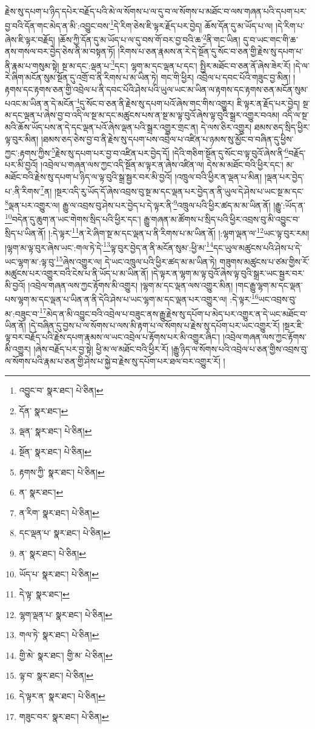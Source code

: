 རྗེས་སུ་དཔག་པ་ཉིད་དཔེར་བརྗོད་པའི་མེ་ལ་སོགས་པ་ལ་དུ་བ་ལ་སོགས་པ་མཐོང་བ་ལས་གཞན་པའི་དཔག་པར་བྱ་བའི་དོན་གང་མེད་ན་མི་:འབྱུང་བས་\footnote{འབྱུང་བ་  སྣར་ཐང་།  པེ་ཅིན། }དེ་རིག་ཅེས་ཇི་ལྟར་རྗོད་པར་བྱེད། ཆོས་དོན་དུ་མ་ཡོད་པ་ལ། །དེ་རིག་པ་ཞེས་ཇི་ལྟར་བརྗོད། །ཆོས་ཀྱི་དོན་དུ་མ་ཡོད་པ་ལ་དུ་བས་གོ་བར་བྱ་བའི་ཆ་\footnote{དོན་  སྣར་ཐང་། }ནི་གང་ཡིན། དུ་བ་ཡང་གང་གི་ཆ་ནས་གསལ་བར་བྱེད་ཅེས་ནི་མ་བསྟན་ཏོ། །རིགས་པ་ཅན་རྣམས་ན་རེ་དེ་སྔོན་དུ་སོང་བ་ཅན་གྱི་རྗེས་སུ་དཔག་པ་ནི་རྣམ་པ་གསུམ་སྟེ། སྔ་མ་དང་:ལྡན་པ་\footnote{ལྡན་  སྣར་ཐང་།  པེ་ཅིན། }དང་། ལྷག་མ་དང་ལྡན་པ་དང་། སྤྱིར་མཐོང་བ་ཅན་ནོ་ཞེས་ཟེར་རོ། །དེ་ལ་རེ་ཞིག་མངོན་སུམ་སྔོན་དུ་འགྲོ་བ་ནི་རིགས་པ་མ་ཡིན་ཏེ། གང་གི་ཕྱིར། འབྲེལ་པ་དབང་པོའི་གཟུང་བྱ་མིན། །རྟགས་དང་རྟགས་ཅན་གྱི་འབྲེལ་པ་ནི་དབང་པོའི་ཤེས་པའི་ཡུལ་ཡང་མ་ཡིན་ལ་རྟགས་དང་རྟགས་ཅན་མངོན་སུམ་པའང་མ་ཡིན་ན་དེ་མངོན་\footnote{སྔོན་  སྣར་ཐང་།  པེ་ཅིན། }དུ་སོང་བ་ཅན་ནི་རྗེས་སུ་དཔག་པའོ་ཞེས་གང་གིས་འགྱུར། ཇི་ལྟར་ན་རྗོད་པར་བྱེད། སྔ་མ་དང་ལྡན་པ་ཞེས་བྱ་བ་འདི་ལ་སྔ་མ་དང་མཚུངས་པས་ན་སྔ་མ་ལྟ་བུའོ་ཞེས་ལྟ་བུའི་སྒྲར་འགྱུར་བའམ། འདི་ལ་སྔ་མའི་ཆོས་ཡོད་པས་ན་དེ་དང་ལྡན་པའོ་ཞེས་ལྡན་པའི་སྒྲར་འགྱུར་གྲང་ན། དེ་ལས་ཅིར་འགྱུར། ཐམས་ཅད་སྲིད་ཕྱིར་ལྟ་བུར་མིན། །ཐམས་ཅད་ཅེས་བྱ་བ་ནི་རྗེས་སུ་དཔག་པས་འབྲེལ་པ་འཛིན་པ་ཉམས་སུ་མྱོང་བ་བཞིན་དུ་ཕྱིས་ཀྱང་:རྟགས་ཀྱིས་\footnote{རྟགས་ཀྱི་  སྣར་ཐང་།  པེ་ཅིན། }རྗེས་སུ་དཔག་པར་བྱ་བ་འཛིན་པར་བྱེད་དོ། །དེའི་གཅིག་སྔོན་དུ་སོང་བ་ལྟ་བུའོ་ཞེས་ནི་\footnote{ན་  སྣར་ཐང་། }བརྗོད་པར་མི་བྱའོ། །འབྲེལ་པ་གཞན་ལས་ཀྱང་འདི་སྔོན་མ་ལྟར་ན་ཞེས་འཛིན་ལ། དེས་མ་མཐོང་བའི་ཕྱིར་དང་། མ་མཐོང་བའི་རྗེས་སུ་དཔག་པ་ཉིད་ལ་ལྟ་བུའི་སྒྲ་སྦྱར་བར་མི་བྱའོ། །འཁྲུལ་བའི་ཕྱིར་ན་ལྡན་པ་མིན། །ལྡན་པར་བྱེད་པ་:ནི་རིགས་\footnote{ན་རིག་  སྣར་ཐང་།  པེ་ཅིན། }ན། །སྔར་འདི་རུ་ཡོད་དོ་ཞེས་འབྲས་བུ་སྔ་མ་དང་ལྡན་པར་བྱེད་ན་ནི་ཡུལ་དེ་ཤེས་པ་ཡང་སྔ་མ་དང་\footnote{དང་ལྡན་པ་  སྣར་ཐང་།  པེ་ཅིན། }ལྡན་པར་འགྱུར་ལ། རྒྱུ་ལ་འབྲས་བུ་ཤེས་པར་བྱེད་པ་དེ་ལྟར་ནི་\footnote{ན་  སྣར་ཐང་།  པེ་ཅིན། }འཁྲུལ་པའི་ཕྱིར་ཚད་མ་མ་ཡིན་ནོ། །རྒྱུ་:ཡོད་ན་\footnote{ཡོད་པ་  སྣར་ཐང་།  པེ་ཅིན། }བདེན་དུ་ཆུག་ན་ཡང་གེགས་སྲིད་པའི་ཕྱིར་དང་། རྒྱུ་གཞན་མ་ཚོགས་པ་སྲིད་པའི་ཕྱིར་འབྲས་བུ་མི་འབྱུང་བ་སྲིད་པ་ཡིན་ནོ། །:དེ་ལྟར་\footnote{དེ་ལྟ་  སྣར་ཐང་། }ན་རེ་ཞིག་སྔ་མ་དང་ལྡན་པ་ནི་རིགས་པ་མ་ཡིན་ནོ། །:ལྷག་ལྡན་ལ་\footnote{ལྷག་ལྡན་པ་  སྣར་ཐང་།  པེ་ཅིན། }ཡང་ལྟ་བུར་རམ། །ལྷག་མ་ལྟ་བུར་ཞེས་ཡང་:གལ་ཏེ་དེ་\footnote{གལ་ཏེ་  སྣར་ཐང་།  པེ་ཅིན། }ལྟ་བུར་བྱེད་ན་ནི་མངོན་སུམ་:ཕྱི་མ་\footnote{གྱི་མེ་  སྣར་ཐང་། གྱི་མ་  པེ་ཅིན། }དང་ཡུལ་མཚུངས་པའི་ཤེས་པ་དེ་ཡང་ལྷག་མ་:ལྟ་བུ་\footnote{ལྟ་བ་  སྣར་ཐང་།  པེ་ཅིན། }ཞེས་འགྱུར་ལ། དེ་ཡང་འཁྲུལ་པའི་ཕྱིར་ཚད་མ་མ་ཡིན་ཏེ། གཟུགས་མཚུངས་པ་ཙམ་གྱིས་རོ་མཚུངས་པར་འགྱུར་བའི་ངེས་པ་ནི་ཡོད་པ་མ་ཡིན་ནོ། །དེ་ལྟར་ན་ལྷག་མ་ལྟ་བུའོ་ཞེས་ལྟ་བུའི་སྒྲར་ཡང་སྦྱར་བར་མི་བྱའོ། །འབྲེལ་གཞན་ལས་ཀྱང་རྟོགས་མི་འགྱུར། །ལྷག་མ་དང་ལྡན་ལས་འགྱུར་མིན། །གང་རྒྱུ་ལྷག་མ་དང་ལྡན་པས་ལྷག་མ་དང་ལྡན་པ་ཡིན་ན་ནི་དེའི་ཤེས་པ་ཡང་ལྷག་མ་དང་ལྡན་པར་འགྱུར་ལ། :དེ་ལྟར་\footnote{དེ་ལྟར་ན་  སྣར་ཐང་།  པེ་ཅིན། }ཡང་འབྲས་བུ་མ་:བཟུང་བ་\footnote{གཟུང་བར་  སྣར་ཐང་།  པེ་ཅིན། }མེད་ན་མི་འབྱུང་བའི་འབྲེལ་པ་བཟུང་ནས་རྒྱུ་རྗེས་སུ་དཔོག་པ་མེད་པར་འགྱུར་ན་དེ་ཡང་མཐོང་བ་ཡིན་ནོ། །དེ་བཞིན་དུ་བྱས་པ་ལ་སོགས་པ་ལས་མི་རྟག་པ་ལ་སོགས་པ་རྗེས་སུ་དཔོག་པར་ཡང་འགྱུར་རོ། །སྔར་ཇི་ལྟ་བར་བརྗོད་པའི་རྗེས་དཔག་རྣམས་ལ་ཡང་འབྲེལ་པ་རྟོགས་པར་མི་འགྱུར་ཞིང་། །འབྲེལ་གཞན་ལས་ཀྱང་རྟོགས་མི་འགྱུར། །ཞེས་བརྗོད་པར་བྱ་སྟེ། ཕྱི་མ་ལ་མཐོང་བའི་ཕྱིར་རོ། །རྒྱུ་ཉིད་ལ་སོགས་པའི་འབྲེལ་པ་ཅན་གྱིས་འབྲས་བུ་ལ་སོགས་པའི་རྣམ་པ་ཅན་གྱི་ཤེས་པ་སྐྱེ་བ་རྗེས་སུ་དཔོག་པར་ཐལ་བར་འགྱུར་རོ། །
